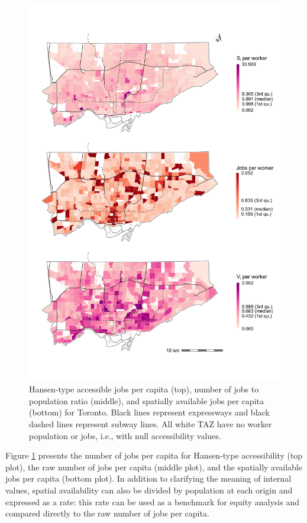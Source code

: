 \documentclass[]{elsarticle} %
\begin{document}
\begin{figure}
\includegraphics[width=1\linewidth]{images/access-job-Toronto-plot-rates} \caption{\label{fig:rate-accessibility-plot}Hansen-type accessible jobs per capita (top), number of jobs to population ratio (middle), and spatially available jobs per capita (bottom) for Toronto. Black lines represent expressways and black dashed lines represent subway lines. All white TAZ have no worker population or jobs, i.e., with null accessibility values.}\label{fig:rate-accessibility-plot}
\end{figure}

Figure \ref{fig:rate-accessibility-plot} presents the number of jobs per
capita for Hansen-type accessibility (top plot), the raw number of jobs
per capita (middle plot), and the spatially available jobs per capita
(bottom plot). In addition to clarifying the meaning of internal values,
spatial availability can also be divided by population at each origin
and expressed as a rate: this rate can be used as a benchmark for equity
analysis and compared directly to the raw number of jobs per capita.
\end{document}
